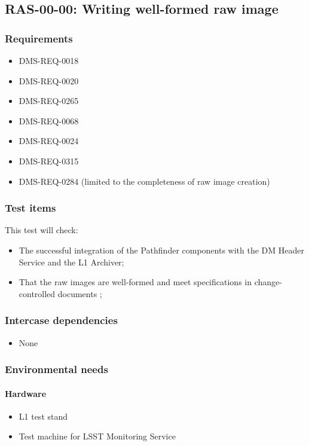 \documentclass[DM,lsstdraft,STS,toc]{lsstdoc}
\begin{document}
\subsection{RAS-00-00: Writing well-formed raw image}
\label{ras-00-00}


\subsubsection{Requirements}

\begin{itemize}
\item{DMS-REQ-0018}
\item{DMS-REQ-0020}
\item{DMS-REQ-0265}
\item{DMS-REQ-0068}
\item{DMS-REQ-0024}
\item{DMS-REQ-0315}
\item{DMS-REQ-0284 (limited to the completeness of raw image creation)}
\end{itemize}


\subsubsection{Test items}
This test will check:


\begin{itemize}
\item{The successful integration of the Pathfinder components with the DM Header Service and the L1 Archiver;}
\item{That the raw images are well-formed and meet specifications in change-controlled documents ;}
\end{itemize}


\subsubsection{Intercase dependencies}
\begin{itemize}
\item{None}
\end{itemize}


\subsubsection{Environmental needs}
\paragraph{Hardware}
\begin{itemize}
\item{L1 test stand}
\item{Test machine for LSST Monitoring Service}
\end{itemize}
\end{document}

